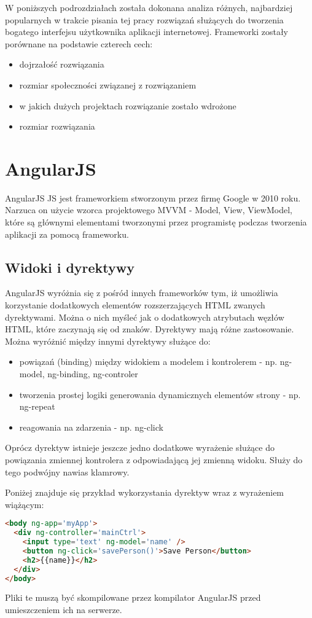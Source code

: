 W poniższych podrozdziałach została dokonana analiza różnych, najbardziej popularnych w trakcie pisania tej pracy rozwiązań służących do tworzenia bogatego interfejsu użytkownika aplikacji internetowej. Frameworki zostały porównane na podstawie czterech cech:
\begin{itemize}
\item dojrzałość rozwiązania
\item rozmiar społeczności związanej z rozwiązaniem
\item w jakich dużych projektach rozwiązanie zostało wdrożone
\item rozmiar rozwiązania
\end{itemize}

\section{AngularJS}

AngularJS JS jest frameworkiem stworzonym przez firmę Google w 2010 roku. Narzuca on użycie wzorca projektowego MVVM - Model, View, ViewModel, które są głównymi elementami tworzonymi przez programistę podczas tworzenia aplikacji za pomocą frameworku. 

\subsection{Widoki i dyrektywy}
AngularJS wyróżnia się z pośród innych frameworków tym, iż umożliwia korzystanie dodatkowych elementów rozszerzających HTML zwanych dyrektywami. Można o nich myśleć jak o dodatkowych atrybutach węzłów HTML, które zaczynają się od znaków. Dyrektywy mają różne zastosowanie. Można wyróżnić między innymi dyrektywy służące do:
\begin{itemize}
\item powiązań (binding) między widokiem a modelem i kontrolerem - np. ng-model, ng-binding, ng-controler
\item tworzenia prostej logiki generowania dynamicznych elementów strony - np. ng-repeat
\item reagowania na zdarzenia - np. ng-click
\end{itemize}

Oprócz dyrektyw istnieje jeszcze jedno dodatkowe wyrażenie służące do powiązania zmiennej kontrolera z odpowiadającą jej zmienną widoku. Służy do tego podwójny nawias klamrowy.

Poniżej znajduje się przykład wykorzystania dyrektyw wraz z wyrażeniem wiążącym:

\begin{lstlisting}[language=HTML]
<body ng-app='myApp'>
  <div ng-controller='mainCtrl'>
    <input type='text' ng-model='name' />
    <button ng-click='savePerson()'>Save Person</button>
    <h2>{{name}}</h2>
  </div>
</body>
\end{lstlisting}

Pliki te muszą być skompilowane przez kompilator AngularJS przed umieszczeniem ich na serwerze.

